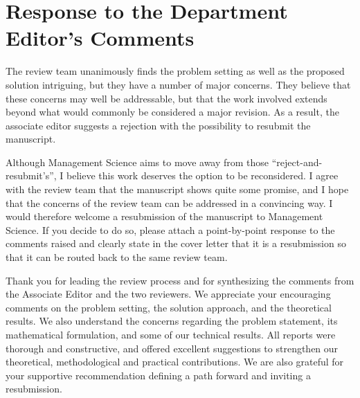 \documentclass[11pt]{article}
\begin{document}
\newpage

\newpage
\section*{Response to the Department Editor's Comments}

\begin{commentBox}

The review team unanimously finds the problem setting as well as the proposed solution intriguing, but they have a number of major concerns. They believe that these concerns may well be addressable, but that the work involved extends beyond what would commonly be considered a major revision. As a result, the associate editor suggests a rejection with the possibility to resubmit the manuscript.

Although Management Science aims to move away from those ``reject-and-resubmit's'', I believe this work deserves the option to be reconsidered. I agree with the review team that the manuscript shows quite some promise, and I hope that the concerns of the review team can be addressed in a convincing way. I would therefore welcome a resubmission of the manuscript to Management Science. If you decide to do so, please attach a point-by-point response to the comments raised and clearly state in the cover letter that it is a resubmission so that it can be routed back to the same review team.
\end{commentBox}

Thank you for leading the review process and for synthesizing the comments from the Associate Editor and the two reviewers. We appreciate your encouraging comments on the problem setting, the solution approach, and the theoretical results. We also understand the concerns regarding the problem statement, its mathematical formulation, and some of our technical results. All reports were thorough and constructive, and offered excellent suggestions to strengthen our theoretical, methodological and practical contributions. We are also grateful for your supportive recommendation defining a path forward and inviting a resubmission.
\end{document}
